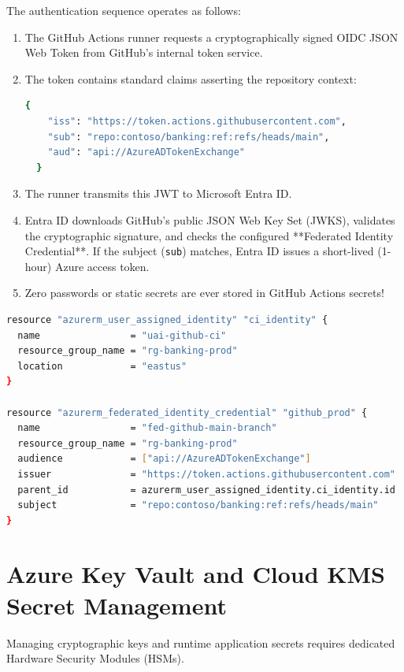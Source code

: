 The authentication sequence operates as follows:
\begin{enumerate}[leftmargin=15pt]
  \item The GitHub Actions runner requests a cryptographically signed OIDC JSON Web Token from GitHub's internal token service.
  \item The token contains standard claims asserting the repository context:
  \begin{lstlisting}[language=bash]
  {
    "iss": "https://token.actions.githubusercontent.com",
    "sub": "repo:contoso/banking:ref:refs/heads/main",
    "aud": "api://AzureADTokenExchange"
  }
  \end{lstlisting}
  \item The runner transmits this JWT to Microsoft Entra ID.
  \item Entra ID downloads GitHub's public JSON Web Key Set (JWKS), validates the cryptographic signature, and checks the configured **Federated Identity Credential**. If the subject (\texttt{sub}) matches, Entra ID issues a short-lived (1-hour) Azure access token.
  \item Zero passwords or static secrets are ever stored in GitHub Actions secrets!
\end{enumerate}

\begin{lstlisting}[language=bash, caption={Terraform HCL for Azure Federated Identity Credential}]
resource "azurerm_user_assigned_identity" "ci_identity" {
  name                = "uai-github-ci"
  resource_group_name = "rg-banking-prod"
  location            = "eastus"
}

resource "azurerm_federated_identity_credential" "github_prod" {
  name                = "fed-github-main-branch"
  resource_group_name = "rg-banking-prod"
  audience            = ["api://AzureADTokenExchange"]
  issuer              = "https://token.actions.githubusercontent.com"
  parent_id           = azurerm_user_assigned_identity.ci_identity.id
  subject             = "repo:contoso/banking:ref:refs/heads/main"
}
\end{lstlisting}

\section{Azure Key Vault and Cloud KMS Secret Management}

Managing cryptographic keys and runtime application secrets requires dedicated Hardware Security Modules (HSMs).

